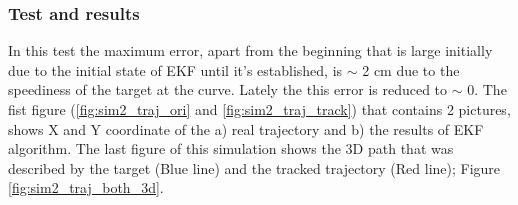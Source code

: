 \subsubsection{Test and results}
\label{lab:sim2_test_results}
In this test the maximum error, apart from the beginning that is large initially due to the initial state of EKF until it's established, is $\sim$ 2 cm due to the speediness of the target at the curve. Lately the this error is reduced to $\sim$ 0. The fist figure (\ref{fig:sim2_traj_ori} and \ref{fig:sim2_traj_track}) that contains 2 pictures, shows X and Y coordinate of the a) real trajectory and b) the results of EKF algorithm. The last figure of this simulation shows the 3D path that was described by the target (Blue line) and the tracked trajectory (Red line); Figure \ref{fig:sim2_traj_both_3d}.

